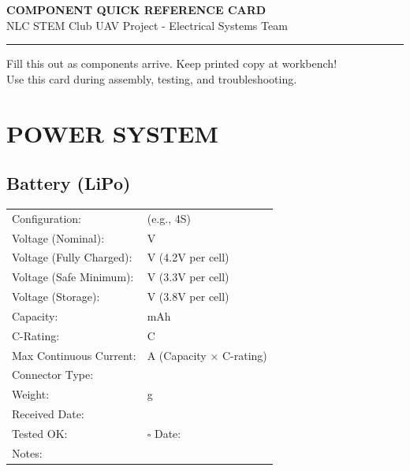 \documentclass[10pt,letterpaper]{article}
\begin{document}
\begin{center}
{\Huge \textbf{COMPONENT QUICK REFERENCE CARD}}\\[0.3em]
{\Large NLC STEM Club UAV Project - Electrical Systems Team}\\[0.5em]
\rule{\textwidth}{2pt}
\end{center}

\begin{tcolorbox}[colback=yellow!10, colframe=orange!80!black, title=\textbf{INSTRUCTIONS}]
Fill this out as components arrive. Keep printed copy at workbench!\\
Use this card during assembly, testing, and troubleshooting.
\end{tcolorbox}

\section*{POWER SYSTEM}

\subsection*{Battery (LiPo)}
\begin{tabularx}{\textwidth}{lX}
Configuration: & \underline{\hspace{4cm}} (e.g., 4S) \\
Voltage (Nominal): & \underline{\hspace{4cm}} V \\
Voltage (Fully Charged): & \underline{\hspace{4cm}} V (4.2V per cell) \\
Voltage (Safe Minimum): & \underline{\hspace{4cm}} V (3.3V per cell) \\
Voltage (Storage): & \underline{\hspace{4cm}} V (3.8V per cell) \\
Capacity: & \underline{\hspace{4cm}} mAh \\
C-Rating: & \underline{\hspace{4cm}} C \\
Max Continuous Current: & \underline{\hspace{4cm}} A (Capacity $\times$ C-rating) \\
Connector Type: & \underline{\hspace{4cm}} \\
Weight: & \underline{\hspace{4cm}} g \\[0.5em]
Received Date: & \underline{\hspace{4cm}} \\
Tested OK: & $\square$ \quad Date: \underline{\hspace{3cm}} \\
Notes: & \underline{\hspace{10cm}} \\
\end{tabularx}
\end{document}
